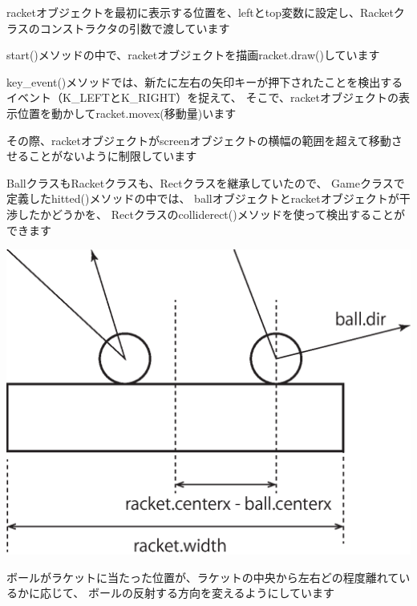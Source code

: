 \documentclass[uplatex,a4paper,11pt,oneside,openany]{jsbook}
\begin{document}
racketオブジェクトを最初に表示する位置を、leftとtop変数に設定し、Racketクラスのコンストラクタの引数で渡しています

start()メソッドの中で、racketオブジェクトを描画racket.draw()しています

key\_event()メソッドでは、新たに左右の矢印キーが押下されたことを検出するイベント（K\_LEFTとK\_RIGHT）を捉えて、
そこで、racketオブジェクトの表示位置を動かしてracket.movex(移動量)います

その際、racketオブジェクトがscreenオブジェクトの横幅の範囲を超えて移動させることがないように制限しています

BallクラスもRacketクラスも、Rectクラスを継承していたので、
Gameクラスで定義したhitted()メソッドの中では、
ballオブジェクトとracketオブジェクトが干渉したかどうかを、
Rectクラスのcolliderect()メソッドを使って検出することができます

\begin{center}
  \includegraphics[width=0.4\hsize]{./figure/hitball.eps}
\end{center}
\newpage

ボールがラケットに当たった位置が、ラケットの中央から左右どの程度離れているかに応じて、
ボールの反射する方向を変えるようにしています
\end{document}
